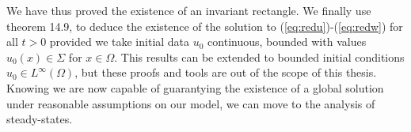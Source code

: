 We have thus proved the existence of an invariant rectangle. We finally use theorem 14.9, \cite{Smoller1994} to deduce the existence of the solution to (\ref{eq:redu})-(\ref{eq:redw}) for all $t>0$ provided we take initial data $u_0$ continuous, bounded with values $u_0(x) \in \Sigma$ for $x \in \Omega$. This results can be extended to bounded initial conditions $u_0 \in L^\infty(\Omega)$, but these proofs and tools are out of the scope of this thesis. Knowing we are now capable of guarantying the existence of a global solution under reasonable assumptions on our model, we can move to the analysis of steady-states.



